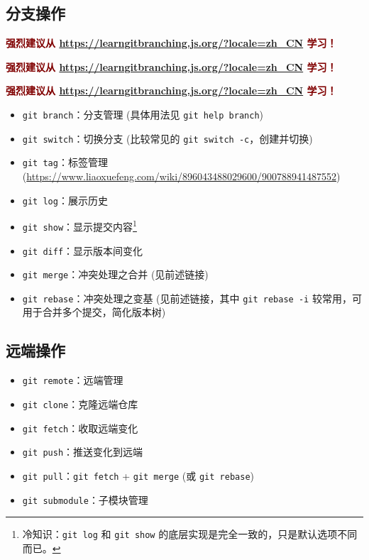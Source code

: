 \documentclass{article}
\begin{document}
	\subsection{分支操作}

	\textcolor{maroon}{\textbf{强烈建议从 \url{https://learngitbranching.js.org/?locale=zh_CN} 学习！}}

	\textcolor{maroon}{\textbf{强烈建议从 \url{https://learngitbranching.js.org/?locale=zh_CN} 学习！}}

	\textcolor{maroon}{\textbf{强烈建议从 \url{https://learngitbranching.js.org/?locale=zh_CN} 学习！}}

	\begin{itemize}
		\itemsep0pt
		\item \texttt{git branch}：分支管理 (具体用法见 \texttt{git help branch})
		\item \texttt{git switch}：切换分支 (比较常见的 \texttt{git switch -c}，创建并切换)
		\item \texttt{git tag}：标签管理 (\url{https://www.liaoxuefeng.com/wiki/896043488029600/900788941487552})
		\item \texttt{git log}：展示历史
		\item \texttt{git show}：显示提交内容\footnote{冷知识：\texttt{git log} 和 \texttt{git show} 的底层实现是完全一致的，只是默认选项不同而已。}
		\item \texttt{git diff}：显示版本间变化
		\item \texttt{git merge}：冲突处理之合并 (见前述链接)
		\item \texttt{git rebase}：冲突处理之变基 (见前述链接，其中 \texttt{git rebase -i} 较常用，可用于合并多个提交，简化版本树)
	\end{itemize}

	\subsection{远端操作}

	\begin{itemize}
		\itemsep0pt
		\item \texttt{git remote}：远端管理
		\item \texttt{git clone}：克隆远端仓库
		\item \texttt{git fetch}：收取远端变化
		\item \texttt{git push}：推送变化到远端
		\item \texttt{git pull}：\texttt{git fetch} + \texttt{git merge} (或 \texttt{git rebase})
		\item \texttt{git submodule}：子模块管理
	\end{itemize}
\end{document}

